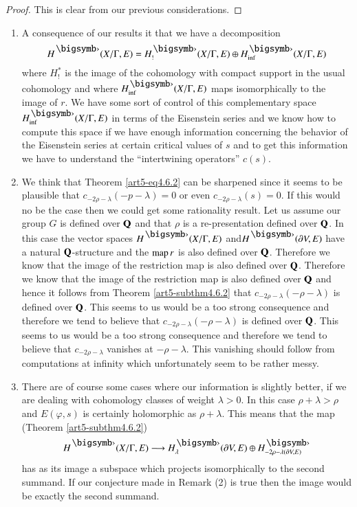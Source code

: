 \begin{proof}
This is clear from our previous considerations.
\end{proof}

\begin{cremarks*}
\begin{enumerate}[(1)]
\item A consequence of our results it that we have a decomposition
$$
H^\bigdot (X/ \Gamma, E) = H^\bigdot_! (X/\Gamma, E) \oplus H^\bigdot_{\inf} (X/ \Gamma , E)
$$
where $H^\ast_!$ is the image of the cohomology with compact support in the usual cohomology and where $H^\bigdot_{\inf} (X/ \Gamma, E)$ maps isomorphically to the image of $r$. We have some sort of control of this complementary space $H^\bigdot_{\inf} (X/ \Gamma, E)$ in terms of the Eisenstein series and we know how to compute this space if we have enough information concerning the behavior of the Eisenstein series at certain critical values of $s$ and to get this information we have to understand the ``intertwining operators'' $c(s)$.

\item We think that Theorem \eqref{art5-eq4.6.2} can be sharpened since it seems to be plausible that $c_{-2\rho-\lambda} (-p -\lambda)=0$ or even $c_{-2\rho -\lambda} (s) = 0$. If this would no be the case then we could get some rationality result. Let us assume our group $G$ is defined over $\mathbf{Q}$ and that $\rho$ is a re-presentation defined over $\mathbf{Q}$. In this case the vector spaces $H^\bigdot (X/ \Gamma, E)$ and\pageoriginale $H^\bigdot (\partial V, E)$ have a natural $\mathbf{Q}$-structure and the $\operatorname{map} r$ is also defined over $\mathbf{Q}$. Therefore we know that the image of the restriction map is also defined over $\mathbf{Q}$. Therefore we know that the image of the restriction map is also defined over $\mathbf{Q}$ and hence it follows from Theorem \eqref{art5-subthm4.6.2} that $c_{-2\rho-\lambda} (-\rho-\lambda)$ is defined over $\mathbf{Q}$. This seems to us would be a too strong consequence and therefore we tend to believe that $c_{-2\rho-\lambda} (-\rho -\lambda)$ is defined over $\mathbf{Q}$. This seems to us would be a too strong consequence and therefore we tend to believe that $c_{-2\rho-\lambda}$ vanishes at $-\rho -\lambda$. This vanishing should follow from computations at infinity which unfortunately seem to be rather messy.

\item There are of course some cases where our information is slightly better, if we are dealing with cohomology classes of weight $\lambda> 0$. In this case $\rho + \lambda > \rho$ and $E(\varphi, s)$ is certainly holomorphic as $\rho + \lambda$. This means that the map (Theorem \eqref{art5-subthm4.6.2})
$$
H^\bigdot (X/ \Gamma , E) \longrightarrow H^\bigdot_{\lambda} (\partial V, E) \oplus H^\bigdot_{- 2 \rho -\lambda (\partial V, E)}
$$
has as its image a subspace which projects isomorphically to the second summand. If our conjecture made in Remark (2) is true then the image would be exactly the second summand.


\end{enumerate}
\end{cremarks*}
